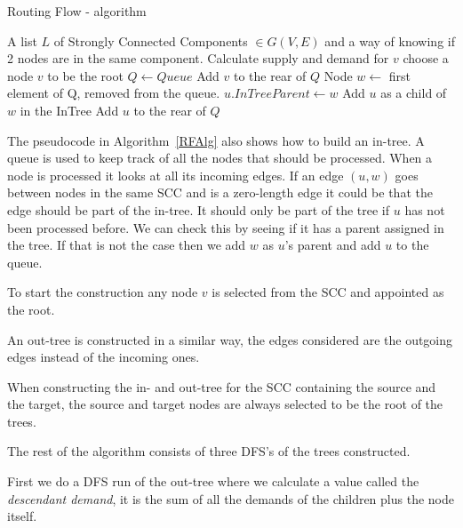 \begin{algorithm}
\caption{Routing Flow - algorithm}\label{RFAlg}
\begin{algorithmic}[1]
	\Statex
\Require A list $L$ of Strongly Connected Components $\in {G(V,E)}$ and a way  of knowing if 2 nodes are in the same component.
		\State Calculate supply and demand for $v$
	\EndFor
		\State\State choose a node $v$ to be the root
		\State{}
		\State{}
		\State{}
	\EndFor
\EndProcedure
\Statex
{}
	\State $Q \gets Queue$
	\State Add $v$ to the rear of $Q$
		\State Node $w \gets$ first element of Q, removed from the queue.
				\State $u.InTreeParent \gets w$
				\State Add $u$ as a child of $w$ in the InTree
				\State Add $u$ to the rear of $Q$
			\EndIf
		\EndFor
	\EndWhile
\EndProcedure
\end{algorithmic}
\end{algorithm}
The pseudocode in Algorithm~\ref{RFAlg} also shows how to build an in-tree. A queue is used to keep track of all the nodes that should be processed.
When a node is processed it looks at all its incoming edges. If an edge $(u,w)$ goes between nodes in the same SCC and is a zero-length edge it could be that
the edge should be part of the in-tree. It should only be part of the tree if $u$ has not been processed before. We can check this by seeing if it has a
parent assigned in the tree. If that is not the case then we add $w$ as $u$'s parent and add $u$ to the queue. 

To start the construction any node $v$ is selected from the SCC and appointed as the root. 

An out-tree is constructed in a similar way, the edges considered are the outgoing edges instead of the incoming ones.

When constructing the in- and out-tree for the SCC containing the source and the target, the source and target nodes are always selected to be the root of the trees.

The rest of the algorithm consists of three DFS's of the trees constructed.

First we do a DFS run of the out-tree where we calculate a value called the \emph{descendant demand}, 
it is the sum of all the demands of the children plus the node itself.

